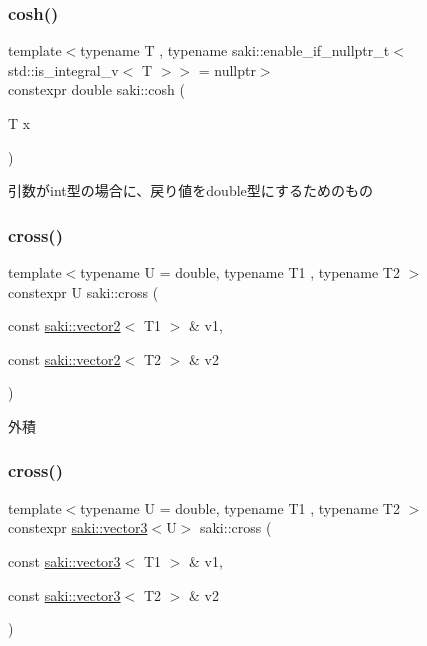 \subsubsection{\texorpdfstring{cosh()}{cosh()}\hspace{0.1cm}{\footnotesize\ttfamily [2/2]}}
{\footnotesize\ttfamily template$<$typename T , typename saki\+::enable\+\_\+if\+\_\+nullptr\+\_\+t$<$ std\+::is\+\_\+integral\+\_\+v$<$ T $>$$>$  = nullptr$>$ \\
constexpr double saki\+::cosh (\begin{DoxyParamCaption}\item[{T}]{x }\end{DoxyParamCaption})}



引数がint型の場合に、戻り値をdouble型にするためのもの 

\mbox{\label{namespacesaki_a457d78ffe360e1d8a78d14ec5dab38f2}} 
\subsubsection{\texorpdfstring{cross()}{cross()}\hspace{0.1cm}{\footnotesize\ttfamily [1/2]}}
{\footnotesize\ttfamily template$<$typename U  = double, typename T1 , typename T2 $>$ \\
constexpr U saki\+::cross (\begin{DoxyParamCaption}\item[{const \mbox{\hyperlink{classsaki_1_1vector2}{saki\+::vector2}}$<$ T1 $>$ \&}]{v1,  }\item[{const \mbox{\hyperlink{classsaki_1_1vector2}{saki\+::vector2}}$<$ T2 $>$ \&}]{v2 }\end{DoxyParamCaption})}



外積 

\mbox{\label{namespacesaki_a980242869d69e47ff8b10335e86ccf6f}} 
\subsubsection{\texorpdfstring{cross()}{cross()}\hspace{0.1cm}{\footnotesize\ttfamily [2/2]}}
{\footnotesize\ttfamily template$<$typename U  = double, typename T1 , typename T2 $>$ \\
constexpr \mbox{\hyperlink{classsaki_1_1vector3}{saki\+::vector3}}$<$U$>$ saki\+::cross (\begin{DoxyParamCaption}\item[{const \mbox{\hyperlink{classsaki_1_1vector3}{saki\+::vector3}}$<$ T1 $>$ \&}]{v1,  }\item[{const \mbox{\hyperlink{classsaki_1_1vector3}{saki\+::vector3}}$<$ T2 $>$ \&}]{v2 }\end{DoxyParamCaption})}



